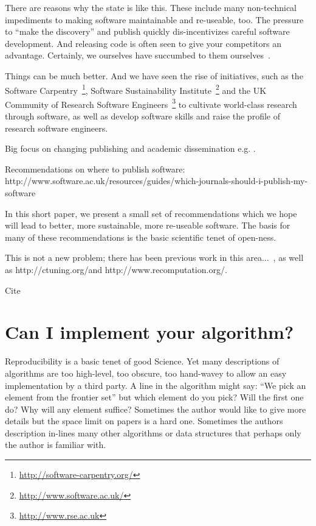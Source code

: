 \documentclass[conference]{IEEEtran}
\begin{document}
There are reasons why the state is like this. These include many
non-technical impediments to making software maintainable and
re-useable, too. The pressure to ``make the discovery'' and publish
quickly dis-incentivizes careful software development. And releasing
code is often seen to give your competitors an advantage. 
Certainly, we ourselves have succumbed to them
ourselves~\cite{crick-et-al:2009, Berdine2011SLAyer}.


Things can be much better. And we have seen the rise of initiatives,
such as the Software
Carpentry~\footnote{\url{http://software-carpentry.org/}}, Software
Sustainability Institute~\footnote{\url{http://www.software.ac.uk/}}
and the UK Community of Research Software
Engineers~\footnote{\url{http://www.rse.ac.uk}} to cultivate
world-class research through software, as well as develop software
skills and raise the profile of research software engineers.



Big focus on changing publishing and academic dissemination
e.g. \cite{stodden-et-al:2013,fursin+dubach:2014}.

Recommendations on where to publish software:
http://www.software.ac.uk/resources/guides/which-journals-should-i-publish-my-software


In this short paper, we present a small set of recommendations which
we hope will lead to better, more sustainable, more re-useable
software. The basis for many of these recommendations is the basic
scientific tenet of open-ness.

This is not a new problem; there has been previous work in this
area...~\cite{sim-et-al:2003,chirigati-et-al:2013}, as well as
http://ctuning.org/and http://www.recomputation.org/.

Cite~\cite{collberg-et-al:2014}


\section{Can I implement your algorithm?}

Reproducibility is a basic tenet of good Science. Yet many
descriptions of algorithms are too high-level, too obscure, too
hand-wavey to allow an easy implementation by a third party. A line in
the algorithm might say: ``We pick an element from the frontier set''
but which element do you pick? Will the first one do? Why will any
element suffice? Sometimes the author would like to give more details
but the space limit on papers is a hard one. Sometimes the authors
description in-lines many other algorithms or data structures that
perhaps only the author is familiar with.
\end{document}
